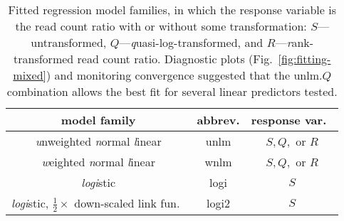 \documentclass[letterpaper]{article}
\begin{document}
\begin{table}[H]
\begin{center}
\begin{tabular}{ccc}
model family & abbrev. & response var.~\\
\hline
\emph{u}nweighted \emph{n}ormal \emph{l}inear & unlm  & \(S, Q,\) or \(R\) \\
\emph{w}eighted \emph{n}ormal \emph{l}inear & wnlm  & \(S, Q,\) or \(R\) \\
\emph{logi}stic & logi & \(S\) \\
\emph{logi}stic, \(\frac{1}{2}\times\) down-scaled link fun.~& logi2 & \(S\) \\
\end{tabular}
\caption{Fitted regression model families, in which the response variable is the read count ratio with or without some transformation: 
\(S\)---untransformed, \(Q\)---\emph{q}uasi-log-transformed, and
\(R\)---\emph{r}ank-transformed read count ratio.  Diagnostic plots
(Fig.~\ref{fig:fitting-mixed}) and monitoring
convergence suggested that the \(\mathrm{unlm}.Q\) combination allows the
best fit for several linear predictors tested.
}
\label{tab:model-names}
\end{center}
\end{table}
\end{document}
